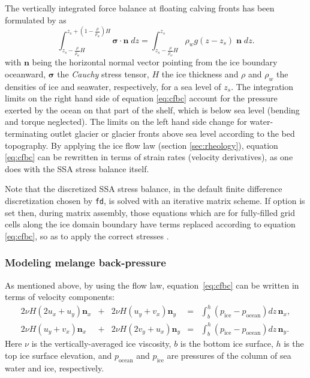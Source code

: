 The vertically integrated force balance at floating calving fronts has been formulated by \cite{Morland} as
\begin{equation}
\int_{z_s-\frac{\rho}{\rho_w}H}^{z_s+(1-\frac{\rho}{\rho_w})H}\mathbf{\sigma}\cdot\mathbf{n}\;dz = \int_{z_s-\frac{\rho}{\rho_w}H}^{z_s}\rho_w g (z-z_s) \;\mathbf{n}\;dz.
\label{eq:cfbc}
\end{equation}
with $\mathbf{n}$ being the horizontal normal vector pointing from the ice boundary oceanward, $\mathbf{\sigma}$ the \emph{Cauchy} stress tensor, $H$ the ice thickness and $\rho$ and $\rho_{w}$ the densities of ice and seawater, respectively, for a sea level of $z_s$. The integration limits on the right hand side of equation \eqref{eq:cfbc} account for the pressure exerted by the ocean on that part of the shelf, which is below sea level (bending and torque neglected). The limits on the left hand side change for water-terminating outlet glacier or glacier fronts above sea level according to the bed topography.  By applying the ice flow law (section \ref{sec:rheology}), equation \eqref{eq:cfbc} can be rewritten in terms of strain rates (velocity derivatives), as one does with the SSA stress balance itself.

Note that the discretized SSA stress balance, in the default finite difference discretization chosen by  \texttt{fd}, is solved with an iterative matrix scheme.  If option  is set then, during matrix assembly, those equations which are for fully-filled grid cells along the ice domain boundary have terms replaced according to equation \eqref{eq:cfbc}, so as to apply the correct stresses \cite{Albrechtetal2011,Winkelmannetal2011}.

\subsubsection{Modeling melange back-pressure}
\label{sec:model-melange-pressure}

As mentioned above, by using the flow law, equation~\eqref{eq:cfbc} can be written in terms of velocity components:
\newcommand{\psw}{p_{\text{ocean}}}
\newcommand{\pice}{p_{\text{ice}}}
\newcommand{\pmelange}{p_{\text{melange}}}
\newcommand{\n}{\mathbf{n}}
\newcommand{\nx}{\n_{x}}
\newcommand{\ny}{\n_{y}}
\begin{equation}
  \label{eq:cfbc-uv}
  \begin{array}{lclcl}
    2 \nu H (2u_x + u_y) \nx &+& 2 \nu H (u_y + v_x)  \ny &=& \displaystyle \int_{b}^{h}(\pice - \psw) dz\, \nx,\\
    2 \nu H (u_y + v_x)  \nx &+& 2 \nu H (2v_y + u_x) \ny &=& \displaystyle \int_{b}^{h}(\pice - \psw) dz\, \ny.
  \end{array}
\end{equation}
Here $\nu$ is the vertically-averaged ice viscosity, $b$ is the bottom ice surface, $h$ is the top ice surface elevation, and $\psw$ and $\pice$ are pressures of the column of sea water and ice, respectively.

